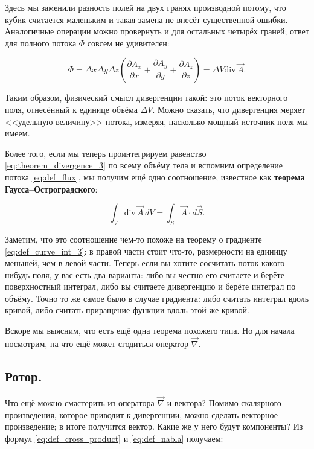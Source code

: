 \documentclass[12pt,a4paper]{article}
\numberwithin{equation}{section}
\numberwithin{equation}{section}
\newcommand{\pt}{\partial}
\renewcommand{\div}{\mathrm{div}\,}
\newcommand{\vn}{\vec{\nabla}}
\begin{document}
Здесь мы заменили разность полей на двух гранях производной потому,
что кубик считается маленьким и такая замена не внесёт существенной
ошибки. Аналогичные операции можно провернуть и для остальных четырёх
граней; ответ для полного потока $\Phi$ совсем не удивителен:

\begin{equation}
  \label{eq:theorem_divergence_3}
  \Phi = \Delta x \Delta y \Delta z
  \left(
    \frac{\pt A_x}{\pt x} + 
    \frac{\pt A_y}{\pt y} + 
    \frac{\pt A_z}{\pt z}
  \right) = \Delta V \div \vec{A}. 
\end{equation}

Таким образом, физический смысл дивергенции такой: это поток
векторного поля, отнесённый к единице объёма $\Delta V$. Можно
сказать, что дивергенция меряет <<удельную величину>> потока, измеряя,
насколько мощный источник поля мы имеем. 

Более того, если мы теперь проинтегрируем равенство
\eqref{eq:theorem_divergence_3} по всему объёму тела и вспомним
определение потока \eqref{eq:def_flux}, мы получим ещё
одно соотношение, известное как \textbf{теорема Гаусса--Остроградского}:

\begin{equation}
  \label{eq:theorem_gauss_ostograd}
  \int_V \div \vec{A}\, dV =  \int_S \vec{A} \cdot  d\vec{S}.
\end{equation}

Заметим, что это соотношение чем-то похоже на теорему о градиенте
\eqref{eq:def_curve_int_3}: в правой части стоит что-то, размерности
на единицу меньшей, чем в левой части. Теперь если вы хотите сосчитать
поток какого--нибудь поля, у вас есть два варианта: либо вы честно его
считаете и берёте поверхностный интеграл, либо вы считаете дивергенцию
и берёте интеграл по объёму. Точно то же самое было в случае
градиента: либо считать интеграл вдоль кривой, либо считать приращение
функции вдоль этой же кривой.

Вскоре мы выясним, что есть ещё одна теорема похожего типа. Но для
начала посмотрим, на что ещё может сгодиться оператор $\vn$. 

\subsection{Ротор.}
\label{sec:curl}

Что ещё можно смастерить из оператора $\vec{\nabla}$ и вектора?
Помимо скалярного произведения, которое приводит к дивергенции, можно
сделать векторное произведение; в итоге получится вектор. Какие же у
него будут компоненты? Из формул \eqref{eq:def_cross_product} и
\eqref{eq:def_nabla} получаем: 
\end{document}
